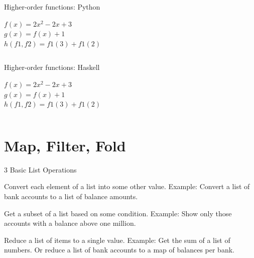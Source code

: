 \documentclass[mathserif]{beamer}
\begin{document}
\begin{frame}{Higher-order functions: Python}

  {\large $f(x) = 2x^2 - 2x + 3$}\\
  {\large $g(x) = f(x) + 1$}\\
  {\large $h(f1, f2) = f1(3) + f1(2)$}\\

  \vskip5mm

  \inputminted[firstline=3,lastline=10]{python}{code/python/higher_order.py}

\end{frame}

\begin{frame}{Higher-order functions: Haskell}

  {\large $f(x) = 2x^2 - 2x + 3$}\\
  {\large $g(x) = f(x) + 1$}\\
  {\large $h(f1, f2) = f1(3) + f1(2)$}\\

  \vskip5mm

  \inputminted[lastline=5]{haskell}{code/haskell/higher_order.hs}

\end{frame}

\section{Map, Filter, Fold}

\begin{frame}{3 Basic List Operations}

  \begin{description}[<+->]
  \item[Map] Convert each element of a list into some other value.
    Example: Convert a list of bank accounts to a list of balance amounts.
  \item[Filter] Get a subset of a list based on some condition.
    Example: Show only those accounts with a balance above one million.
  \item[Fold] Reduce a list of items to a single value.
    Example: Get the sum of a list of numbers.
    Or reduce a list of bank accounts to a map of balances per bank.
  \end{description}

\end{frame}
\end{document}
